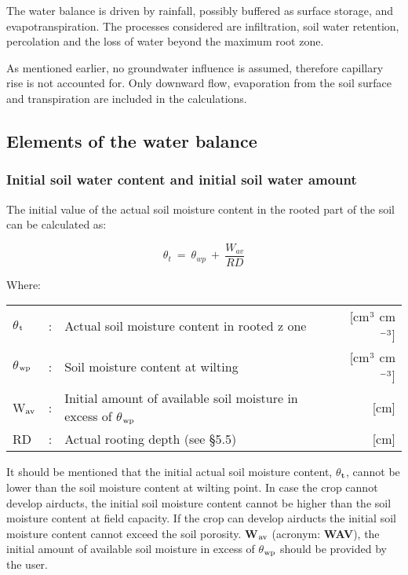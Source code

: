 The water balance is driven by rainfall, possibly buffered as surface storage, and
evapotranspiration. The processes considered are infiltration, soil water retention,
percolation and the loss of water beyond the maximum root zone.

As mentioned earlier, no groundwater influence is assumed, therefore capillary rise is not
accounted for. Only downward flow, evaporation from the soil surface and transpiration
are included in the calculations. 

\subsection{Elements of the water balance  }
\label{sec:WBElements}

\subsubsection{Initial soil water content and initial soil water amount}

The initial value of the actual soil moisture content in the rooted part of the soil can be
calculated as:

\begin{equation}
\label{eq:6.18}
\theta_{t} ~ =~\theta_{wp} ~+~{\frac{W_{av}}{RD}}
\end{equation}

Where:\\[5pt]
\begin{tabularx}{\textwidth}{llXr}
$\theta$$_{{\rm t}}$ &:& Actual soil moisture content in rooted z
    one  & [cm$^{{\rm 3}}$ cm$^{{\rm -3}}$]\\
$\theta$$_{{\rm wp}}$ &:& Soil moisture content at wilting   & [cm$^{{\rm 3}}$ cm$^{{\rm -3}}$]\\
W$_{{\rm av}}$ &:& Initial amount of available soil moisture 
    in excess of $\theta$$_{{\rm wp}}$ & [cm]\\
RD &:& Actual rooting depth (see \S 5.5) & [cm]\\
\end{tabularx}

It should be mentioned that the initial actual soil moisture content, $\theta$$_{{\rm t}}$, cannot be lower
than the soil moisture content at wilting point. In case the crop cannot develop airducts,
the initial soil moisture content cannot be higher than the soil moisture content at field
capacity. If the crop can develop airducts the initial soil moisture content cannot exceed
the soil porosity. {\bf W$_{{\rm av}}$} (acronym: {\bf WAV}), the initial amount of available 
soil moisture in excess of $\theta$$_{{\rm wp}}$ should be provided by the user. 


